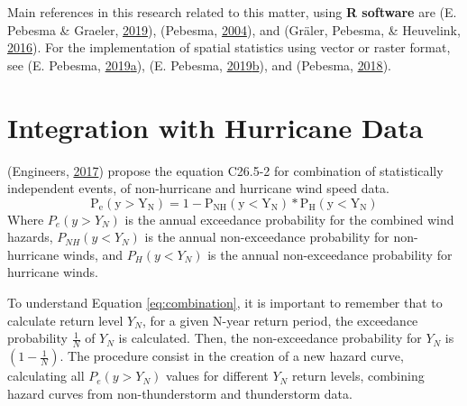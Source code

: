 \documentclass[12pt,oneside]{reedthesis}
\begin{document}
Main references in this research related to this matter, using \textbf{R software} are (E. Pebesma \& Graeler, \protect\hyperlink{ref-Pebesma2019}{2019}), (Pebesma, \protect\hyperlink{ref-Pebesma2004}{2004}), and (Gräler, Pebesma, \& Heuvelink, \protect\hyperlink{ref-Graeler2016}{2016}). For the implementation of spatial statistics using vector or raster format, see (E. Pebesma, \protect\hyperlink{ref-Pebesma2019a}{2019}\protect\hyperlink{ref-Pebesma2019a}{a}), (E. Pebesma, \protect\hyperlink{ref-Pebesma2019b}{2019}\protect\hyperlink{ref-Pebesma2019b}{b}), and (Pebesma, \protect\hyperlink{ref-Pebesma2018}{2018}).

\hypertarget{integration}{%
\section{Integration with Hurricane Data}\label{integration}}

(Engineers, \protect\hyperlink{ref-Asce2017}{2017}) propose the equation C26.5-2 for combination of statistically independent events, of non-hurricane and hurricane wind speed data.
\begin{equation}
  \mathrm{
          P_e(y>Y_N) = 1 - P_{NH}(y<Y_N)*P_{H}(y<Y_N)
        }
  \label{eq:combination}
\end{equation}
Where \(P_e(y>Y_N)\) is the annual exceedance probability for the combined wind hazards, \(P_{NH}(y<Y_N)\) is the annual non-exceedance probability for non-hurricane winds, and \(P_{H}(y<Y_N)\) is the annual non-exceedance probability for hurricane winds.

To understand Equation \eqref{eq:combination}, it is important to remember that to calculate return level \(Y_N\), for a given N-year return period, the exceedance probability \(\frac{1}{N}\) of \(Y_N\) is calculated. Then, the non-exceedance probability for \(Y_N\) is \(\left(1-\frac{1}{N}\right)\). The procedure consist in the creation of a new hazard curve, calculating all \(P_e(y>Y_N)\) values for different \(Y_N\) return levels, combining hazard curves from non-thunderstorm and thunderstorm data.
\end{document}
